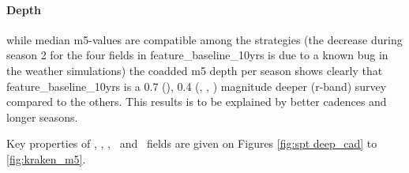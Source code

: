 \paragraph{Depth} while median m5-values are compatible among the strategies (the decrease during season 2 for the four fields in  feature\_baseline\_10yrs is due to a known bug in the weather simulations) the coadded m5 depth per season shows clearly that feature\_baseline\_10yrs is a 0.7 (\cosmos), 0.4 (\xmmlss, \cdfs, \elais) magnitude deeper (r-band) survey compared to the others. This results is to be explained by better cadences and longer seasons.
 
Key properties of \spt, \ddfa, \ddfb, \ddfc~and \ddfb~fields are given on Figures \ref{fig:spt deep_cad} to \ref{fig:kraken_m5}.
